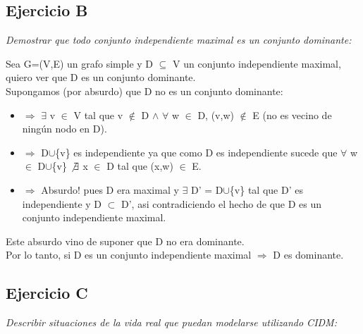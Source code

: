 \newpage

\subsection{Ejercicio B}

\textit{Demostrar que todo conjunto independiente maximal es un conjunto dominante:}

\medskip

Sea G=(V,E) un grafo simple y D $\subseteq$ V un conjunto independiente maximal, quiero ver que D es un conjunto dominante.\\
Supongamos (por absurdo) que D no es un conjunto dominante:
\begin{itemize}
\item[] $\Rightarrow$ $\exists$ v $\in$ V tal que v $\not\in$ D $\wedge$ $\forall$ w $\in$ D, (v,w) $\not\in$ E (no es vecino de ningún nodo en D).
\item[] $\Rightarrow$ D$\cup$\{v\} es independiente ya que como D es independiente sucede que $\forall$ w $\in$ D$\cup$\{v\} $\not\exists$ x $\in$ D tal que (x,w) $\in$ E.
\item[] $\Rightarrow$ Absurdo! pues D era maximal y $\exists$ D' = D$\cup$\{v\} tal que D' es independiente y D $\subset$ D', asi contradiciendo el hecho de que D es un conjunto independiente maximal.
\end{itemize}
Este absurdo vino de suponer que D no era dominante.\\
Por lo tanto, si D es un conjunto independiente maximal $\Rightarrow$ D es dominante.

\subsection{Ejercicio C}

\textit{Describir situaciones de la vida real que puedan modelarse utilizando CIDM:}

\medskip

